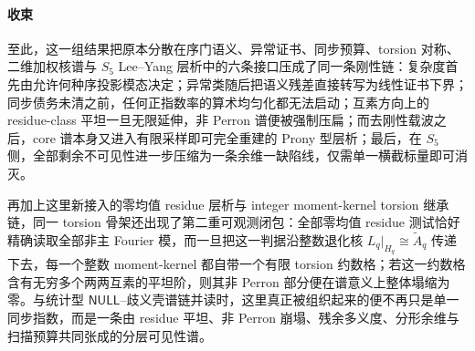 





\paragraph{收束}
至此，这一组结果把原本分散在序门语义、异常证书、同步预算、torsion 对称、二维加权核谱与 \(S_5\) Lee--Yang 层析中的六条接口压成了同一条刚性链：复杂度首先由允许何种序投影模态决定；异常类随后把语义残差直接转写为线性证书下界；同步债务未清之前，任何正指数率的算术均匀化都无法启动；互素方向上的 residue-class 平坦一旦无限延伸，非 Perron 谱便被强制压扁；而去刚性载波之后，core 谱本身又进入有限采样即可完全重建的 Prony 型层析；最后，在 \(S_5\) 侧，全部剩余不可见性进一步压缩为一条余维一缺陷线，仅需单一横截标量即可消灭。

再加上这里新接入的零均值 residue 层析与 integer moment-kernel torsion 继承链，同一 torsion 骨架还出现了第二重可观测闭包：全部零均值 residue 测试恰好精确读取全部非主 Fourier 模，而一旦把这一判据沿整数退化核 \(L_q|_{H_q}\cong \widetilde A_q\) 传递下去，每一个整数 moment-kernel 都自带一个有限 torsion 约数格；若这一约数格含有无穷多个两两互素的平坦阶，则其非 Perron 部分便在谱意义上整体塌缩为零。与统计型 \(\mathsf{NULL}\)--歧义壳谱链并读时，这里真正被组织起来的便不再只是单一同步指数，而是一条由 residue 平坦、非 Perron 崩塌、残余多义度、分形余维与扫描预算共同张成的分层可见性谱。

\endinput
